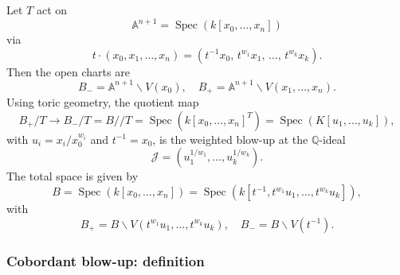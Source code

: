 \documentclass{amsart}
\newcommand{\QQ}{{\mathbb{Q}}}
\newcommand{\cA}{{\mathcal A}}
\newcommand{\cJ}{{\mathcal J}}
\newcommand{\cO}{{\mathcal O}}
\newcommand{\ext}{{\operatorname{ext}}}
\newcommand{\Spec}{\operatorname{Spec}}
\newcommand{\lcm}{{\operatorname{lcm}}}
\renewcommand{\setminus}{\smallsetminus}
\begin{document}
Let \( T \) act on $$ \mathbb{A}^{n+1} = \Spec(k[x_0, \ldots, x_n]) $$via
\[
t \cdot (x_0, x_1, \ldots, x_n) = (t^{-1} x_0,\, t^{w_1} x_1,\, \ldots,\, t^{w_k} x_k).
\]
Then the open charts are
\[
B_- = \mathbb{A}^{n+1} \setminus V(x_0), \quad B_+ = \mathbb{A}^{n+1} \setminus V(x_1, \ldots, x_n).
\]
Using toric geometry, the quotient map
\[
B_+/T \longrightarrow B_-/T = B // T = \Spec(k[x_0, \ldots, x_n]^T) = \Spec(K[u_1, \ldots, u_k]),
\]
with \( u_i = x_i / x_0^{w_i} \) and \( t^{-1} = x_0 \), is the weighted blow-up at the \(\mathbb{Q}\)-ideal
\[
\mathcal{J} = (u_1^{1/w_1}, \ldots, u_k^{1/w_k}).
\]
The total space is given by
\[
B = \Spec(k[x_0, \ldots, x_n]) = \Spec(k[t^{-1}, t^{w_1} u_1, \ldots, t^{w_k} u_k]),
\]
with
\[
B_+ = B \setminus V(t^{w_1} u_1, \ldots, t^{w_k} u_k), \quad B_- = B \setminus V(t^{-1}).
\]%



\subsubsection{Cobordant blow-up: definition}
\end{document}
